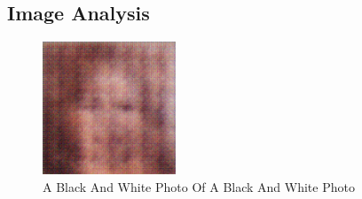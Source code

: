 \documentclass{article}%
\begin{document}
%
\subsection{Image Analysis}%
\label{subsec:ImageAnalysis}%


\begin{figure}[h!]%
\centering%
\includegraphics[width=150px]{500_fake_images/samples_5_309.png}%
\caption{A Black And White Photo Of A Black And White Photo}%
\end{figure}

%
\end{document}
